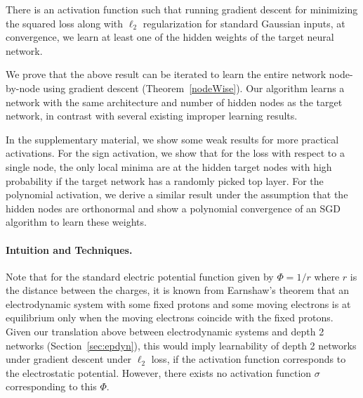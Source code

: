 %
\begin{theorem}
There is an activation function such that running gradient
  descent for minimizing the squared loss along with $\ell_2$
  regularization for standard Gaussian inputs, at convergence, 
  we learn at least one of
  the hidden weights of the target neural network.
\end{theorem}
%
We  prove that the above result can be iterated to learn the entire network node-by-node using gradient descent (Theorem~\ref{nodeWise}).  Our algorithm learns a network with the same architecture and number of hidden nodes as the target network, 
in contrast with several existing improper learning results.

In the supplementary material, we show some weak results for more practical activations. For the sign activation, we show that for the loss with respect to a single node, the only local minima are at the hidden target nodes with high probability if the target network has a randomly picked top layer. For the polynomial activation, we derive a similar result under the assumption that the hidden nodes are orthonormal and show a polynomial convergence of an SGD algorithm to learn these weights.



\paragraph{Intuition and Techniques.}
%
Note that for the standard electric potential function given by $\Phi = 1/r$ where $r$ is the distance between the charges, it is known from Earnshaw's theorem that an electrodynamic system with some fixed protons and some moving electrons is at equilibrium only when the moving electrons coincide with the fixed protons. Given our translation above between electrodynamic systems and depth 2 networks (Section~\ref{sec:epdyn}), this would imply learnability of depth 2 networks under gradient descent under $\ell_2$ loss, if the activation function corresponds to the electrostatic potential. However, there exists no activation function $\sigma$ corresponding to this $\Phi$.
%

